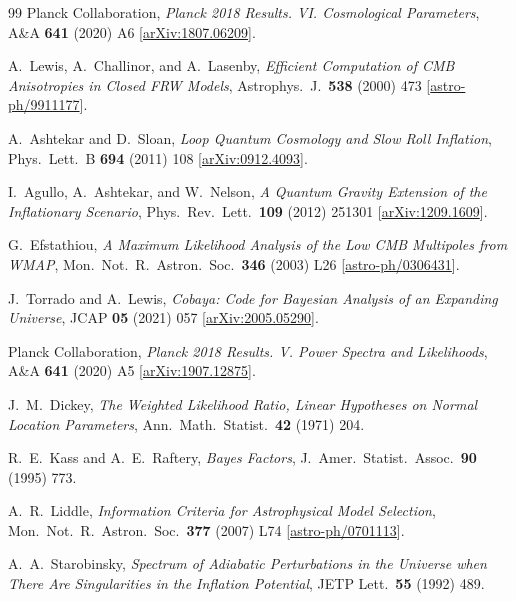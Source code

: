\documentclass[a4paper,11pt]{article}
\begin{document}
\begin{thebibliography}{99}
Planck Collaboration,
\textit{Planck 2018 Results. VI. Cosmological Parameters},
A\&A \textbf{641} (2020) A6
[\href{https://arxiv.org/abs/1807.06209}{arXiv:1807.06209}].

A.~Lewis, A.~Challinor, and A.~Lasenby,
\textit{Efficient Computation of CMB Anisotropies in Closed FRW Models},
Astrophys.\ J.\ \textbf{538} (2000) 473
[\href{https://arxiv.org/abs/astro-ph/9911177}{astro-ph/9911177}].

A.~Ashtekar and D.~Sloan,
\textit{Loop Quantum Cosmology and Slow Roll Inflation},
Phys.\ Lett.\ B \textbf{694} (2011) 108
[\href{https://arxiv.org/abs/0912.4093}{arXiv:0912.4093}].

I.~Agullo, A.~Ashtekar, and W.~Nelson,
\textit{A Quantum Gravity Extension of the Inflationary Scenario},
Phys.\ Rev.\ Lett.\ \textbf{109} (2012) 251301
[\href{https://arxiv.org/abs/1209.1609}{arXiv:1209.1609}].

G.~Efstathiou,
\textit{A Maximum Likelihood Analysis of the Low CMB Multipoles from WMAP},
Mon.\ Not.\ R.\ Astron.\ Soc.\ \textbf{346} (2003) L26
[\href{https://arxiv.org/abs/astro-ph/0306431}{astro-ph/0306431}].

J.~Torrado and A.~Lewis,
\textit{Cobaya: Code for Bayesian Analysis of an Expanding Universe},
JCAP \textbf{05} (2021) 057
[\href{https://arxiv.org/abs/2005.05290}{arXiv:2005.05290}].

Planck Collaboration,
\textit{Planck 2018 Results. V. Power Spectra and Likelihoods},
A\&A \textbf{641} (2020) A5
[\href{https://arxiv.org/abs/1907.12875}{arXiv:1907.12875}].

J.~M.~Dickey,
\textit{The Weighted Likelihood Ratio, Linear Hypotheses on Normal Location Parameters},
Ann.\ Math.\ Statist.\ \textbf{42} (1971) 204.

R.~E.~Kass and A.~E.~Raftery,
\textit{Bayes Factors},
J.\ Amer.\ Statist.\ Assoc.\ \textbf{90} (1995) 773.

A.~R.~Liddle,
\textit{Information Criteria for Astrophysical Model Selection},
Mon.\ Not.\ R.\ Astron.\ Soc.\ \textbf{377} (2007) L74
[\href{https://arxiv.org/abs/astro-ph/0701113}{astro-ph/0701113}].

A.~A.~Starobinsky,
\textit{Spectrum of Adiabatic Perturbations in the Universe when There Are Singularities in the Inflation Potential},
JETP Lett.\ \textbf{55} (1992) 489.


\end{thebibliography}
\end{document}
